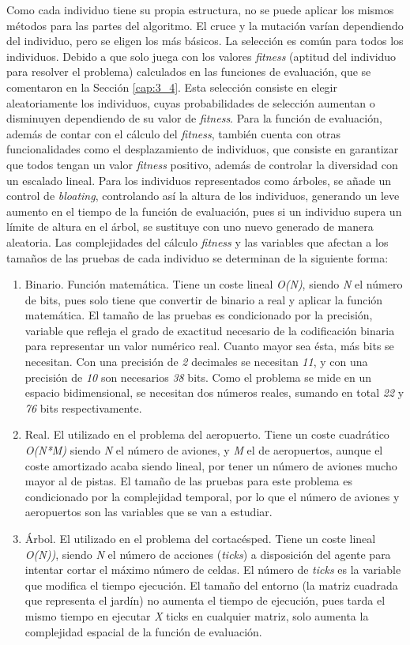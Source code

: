 Como cada individuo tiene su propia estructura, no se puede aplicar los mismos métodos para las partes del algoritmo. El cruce y la mutación varían dependiendo del individuo, pero se eligen los más básicos. La selección es común para todos los individuos. Debido a que solo juega con los valores \textit{fitness} (aptitud del individuo para resolver el problema) calculados en las funciones de evaluación, que se comentaron en la Sección \ref{cap:3_4}. Esta selección consiste en elegir aleatoriamente los individuos, cuyas probabilidades de selección aumentan o disminuyen dependiendo de su valor de \textit{fitness}. Para la función de evaluación, además de contar con el cálculo del \textit{fitness}, también cuenta con otras funcionalidades como el desplazamiento de individuos, que consiste en garantizar que todos tengan un valor \textit{fitness} positivo, además de controlar la diversidad con un escalado lineal. Para los individuos representados como árboles, se añade un control de \textit{bloating}, controlando así la altura de los individuos, generando un leve aumento en el tiempo de la función de evaluación, pues si un individuo supera un límite de altura en el árbol, se sustituye con uno nuevo generado de manera aleatoria. Las complejidades del cálculo \textit{fitness} y las variables que afectan a los tamaños de las pruebas de cada individuo se determinan de la siguiente forma:
\begin{enumerate}
	\item Binario. Función matemática. Tiene un coste lineal \textit{O(N)}, siendo \textit{N} el número de bits, pues solo tiene que convertir de binario a real y aplicar la función matemática. El tamaño de las pruebas es condicionado por la precisión, variable que refleja el grado de exactitud necesario de la codificación binaria para representar un valor numérico real. Cuanto mayor sea ésta, más bits se necesitan. Con una precisión de \textit{2} decimales se necesitan \textit{11}, y con una precisión de \textit{10} son necesarios \textit{38} bits. Como el problema se mide en un espacio bidimensional, se necesitan dos números reales, sumando en total \textit{22} y \textit{76} bits respectivamente. 
	\item Real. El utilizado en el problema del aeropuerto. Tiene un coste cuadrático \textit{O(N*M)} siendo \textit{N} el número de aviones, y \textit{M} el de aeropuertos, aunque el coste amortizado acaba siendo lineal, por tener un número de aviones mucho mayor al de pistas. El tamaño de las pruebas para este problema es condicionado por la complejidad temporal, por lo que el número de aviones y aeropuertos son las variables que se van a estudiar.						
	\item Árbol. El utilizado en el problema del cortacésped. Tiene un coste lineal \textit{O(N))}, siendo \textit{N} el número de acciones (\textit{ticks}) a disposición del agente para intentar cortar el máximo número de celdas. El número de \textit{ticks} es la variable que modifica el tiempo ejecución. El tamaño del entorno (la matriz cuadrada que representa el jardín) no aumenta el tiempo de ejecución, pues tarda el mismo tiempo en ejecutar \textit{X} ticks en cualquier matriz, solo aumenta la complejidad espacial de la función de evaluación. 
\end{enumerate}
